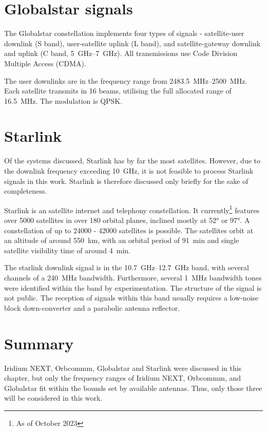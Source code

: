 \section{Globalstar signals}
The Globalstar constellation implements four types of signals - satellite-user downlink (S band), user-satellite uplink (L band), and satellite-gateway downlink and uplink (C band, \qtyrange{5}{7}{GHz}). All transmissions use Code Division Multiple Access (CDMA)\cite{sat10}.

The user downlinks are in the frequency range from \qtyrange{2483.5}{2500}{MHz}. Each satellite transmits in 16 beams, utilising the full allocated range of \qty{16.5}{MHz}. The modulation is QPSK\cite{sat14}.

\section{Starlink}
Of the systems discussed, Starlink has by far the most satellites. However, due to the downlink frequency exceeding \qty{10}{GHz}, it is not feasible to process Starlink signals in this work. Starlink is therefore discussed only briefly for the sake of completeness.

Starlink is an satellite internet and telephony constellation. It currently\footnote{As of October 2023} features over \num{5000} satellites in over 180 orbital planes, inclined mostly at \ang{52} or \ang{97}. A constellation of up to 24000 - 42000 satellites is possible\cite{sop02}. The satellites orbit at an altitude of around \qty{550}{km}, with an orbital period of \qty{91}{min} and single satellite visibility time of around \qty{4}{min}.

The starlink downlink signal is in the \qtyrange{10.7}{12.7}{GHz} band, with several channels of a \qty{240}{MHz} bandwidth. Furthermore, several \qty{1}{MHz} bandwidth tones were identified within the band by experimentation. The structure of the signal is not public. The reception of signals within this band usually requires a low-noise block down-converter and a parabolic antenna reflector\cite{sop04}.

\section{Summary}
Iridium NEXT, Orbcommm, Globalstar and Starlink were discussed in this chapter, but only the frequency ranges of Iridium NEXT, Orbcommm, and Globalstar fit within the bounds set by available antennas. Thus, only those three will be considered in this work.

